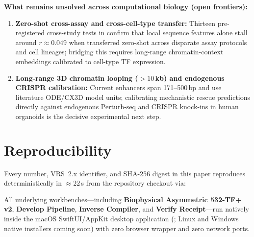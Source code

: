 \documentclass[10.5pt,a4paper]{article}
\begin{document}
\textbf{What remains unsolved across computational biology (open frontiers):}
\begin{enumerate}
\item \textbf{Zero-shot cross-assay and cross-cell-type transfer:} Thirteen pre-registered cross-study tests in  confirm that local sequence features alone stall around $r\approx 0.049$ when transferred zero-shot across disparate assay protocols and cell lineages; bridging this requires long-range chromatin-context embeddings calibrated to cell-type TF expression.
\item \textbf{Long-range 3D chromatin looping ($>10$\,kb) and endogenous CRISPR calibration:} Current enhancers span 171--500\,bp and use literature ODE/CX3D model units; calibrating mechanistic rescue predictions directly against endogenous Perturb-seq and CRISPR knock-ins in human organoids is the decisive experimental next step.
\end{enumerate}

\section{Reproducibility}

Every number, VRS~2.x identifier, and SHA-256 digest in this paper reproduces deterministically in $\approx 22$\,s from the repository checkout via:
\begin{center}
\end{center}
All underlying workbenches—including \textbf{Biophysical Asymmetric 532-TF+ v2}, \textbf{Develop Pipeline}, \textbf{Inverse Compiler}, and \textbf{Verify Receipt}—run natively inside the macOS SwiftUI/AppKit desktop application (; Linux and Windows native installers coming soon\texttrademark) with zero browser wrapper and zero network ports.


\end{document}

